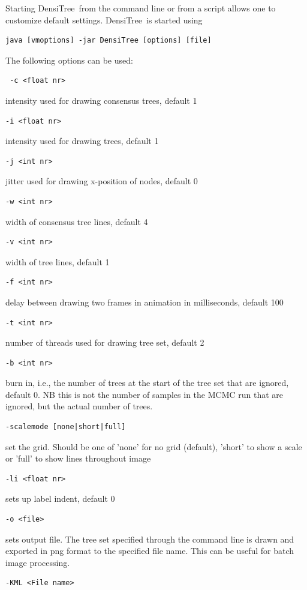 \documentclass{article}
\def\DensiTree{DensiTree}
\begin{document}
Starting \DensiTree\ from the command line or from a script allows
one to customize default settings. \DensiTree\ is started using
\begin{verbatim} 
java [vmoptions] -jar DensiTree [options] [file]
\end{verbatim}
The following options can be used:
\begin{verbatim} -c <float nr>\end{verbatim}
 intensity used for drawing consensus trees, default 1
\begin{verbatim}-i <float nr>\end{verbatim}
 intensity used for drawing trees, default 1
\begin{verbatim}-j <int nr>\end{verbatim}
jitter used for drawing x-position of nodes, default 0
\begin{verbatim}-w <int nr>\end{verbatim}
width of consensus tree lines, default 4
\begin{verbatim}-v <int nr>\end{verbatim}
width of tree lines, default 1
\begin{verbatim}-f <int nr>\end{verbatim}
delay between drawing two frames in animation in milliseconds, default 100
\begin{verbatim}-t <int nr>\end{verbatim}
number of threads used for drawing tree set, default 2
\begin{verbatim}-b <int nr>\end{verbatim}
burn in, i.e., the number of trees at the start of the tree set that are ignored, default 0. NB this is not the number of samples in
the MCMC run that are ignored, but the actual number of trees.
\begin{verbatim}-scalemode [none|short|full]\end{verbatim}
set the grid. Should be one of 'none' for no grid (default), 'short' to show a scale or 'full' to show lines throughout image
\begin{verbatim}-li <float nr>\end{verbatim}
sets up label indent, default 0
\begin{verbatim}-o <file>\end{verbatim}
sets output file. The tree set specified through the command line is drawn and
exported in png format to the specified file name. 
This can be useful for batch image processing.
\begin{verbatim}-KML <File name>\end{verbatim}
\end{document}
